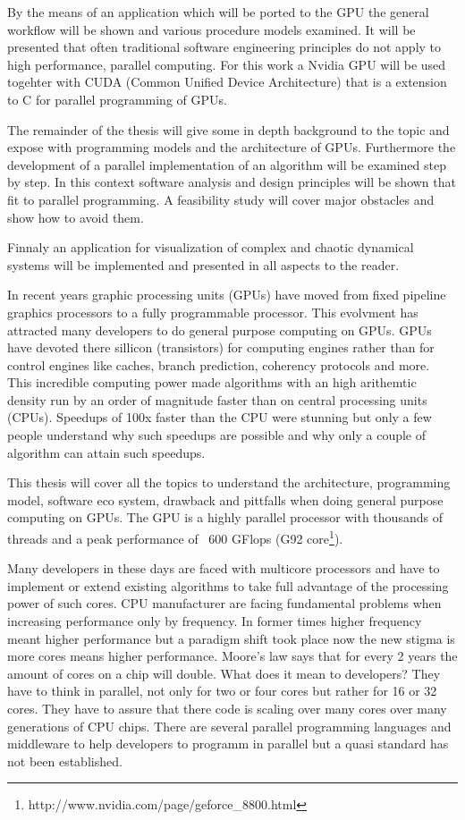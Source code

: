 By the means of an application which will be ported to the \gls{GPU} the general
workflow will be shown and various procedure models examined. It will be
presented that often traditional software engineering principles do not
apply to high performance, parallel computing. For this work a Nvidia \gls{GPU} will
be used togehter with CUDA (Common Unified Device Architecture) that is a
extension to C for parallel programming of GPUs. 

The remainder of the thesis will give some in depth background to the topic and
expose with programming models and the architecture of GPUs. Furthermore the
development of a parallel implementation of an algorithm will be examined step
by step. In this context software analysis and design principles will be shown
that fit to parallel programming. A feasibility study will cover major obstacles
and show how to avoid them.

Finnaly an application for visualization of complex and chaotic dynamical
systems will be implemented and presented in all aspects to the reader.

In recent years graphic processing units (GPUs) have moved from fixed pipeline
graphics processors to a fully programmable processor. This evolvment has
attracted many developers to do general purpose computing on GPUs. GPUs have
devoted there sillicon (transistors) for computing engines rather than for
control engines like caches, branch prediction, coherency protocols and more.
This incredible computing power made algorithms with an high arithemtic density
run by an order of magnitude faster than on central processing units (CPUs).
Speedups of 100x faster than the CPU were stunning but only a few people
understand why such speedups are possible and why only a couple of algorithm can
attain such speedups.

This thesis will cover all the topics to understand the architecture,
programming model, software eco system, drawback and pittfalls when doing
general purpose computing on GPUs. The \gls{GPU} is a highly parallel processor with
thousands of threads and a peak performance of ~600 GFlops (G92
core\footnote{http://www.nvidia.com/page/geforce\_8800.html}).

Many developers in these days are faced with multicore processors and have to
implement or extend existing algorithms to take full advantage of the
processing power of such cores. CPU manufacturer are facing fundamental problems
when increasing performance only by frequency. In former times higher frequency
meant higher performance but a paradigm shift took place now the new stigma is
more cores means higher performance. Moore's law says that for every 2 years the
amount of cores on a chip will double. What does it mean to developers? They
have to think in parallel, not only for two or four cores but rather for 16 or
32 cores. They have to assure that there code is scaling over many cores over
many generations of CPU chips. There are several parallel programming languages
and middleware to help developers to programm in parallel but a quasi standard
has not been established.

